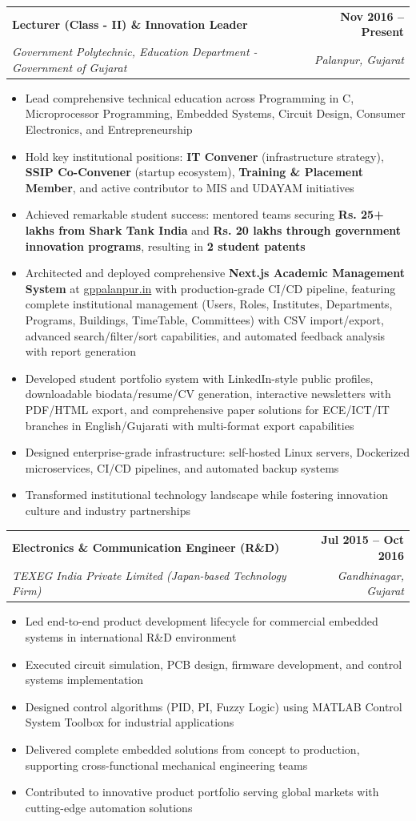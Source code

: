 \documentclass[11pt,a4paper]{article}
\makeatletter
\newcommand{\resumeItem}[1]{
    \item\small{#1 \vspace{-1pt}}
}
\newcommand{\resumeSubheading}[4]{
    \vspace{-1pt}\item
    \begin{tabular*}{0.97\textwidth}[t]{l@{\extracolsep{\fill}}r}
        \textbf{\color{secondary}#1} & \textbf{\color{mediumgray}\small #2} \\
        \textit{\small\color{primary}#3} & \textit{\small\color{mediumgray} #4} \\
    \end{tabular*}\vspace{-3pt}
}
\newcommand{\resumeItemListStart}{\begin{itemize}[leftmargin=0.3in]}
\newcommand{\resumeItemListEnd}{\end{itemize}\vspace{-4pt}}
\makeatother
\begin{document}
\resumeSubheading
{Lecturer (Class - II) \& Innovation Leader}{Nov 2016 -- Present}
{Government Polytechnic, Education Department - Government of Gujarat}{Palanpur, Gujarat}
\resumeItemListStart
\resumeItem{Lead comprehensive technical education across Programming in C, Microprocessor Programming, Embedded Systems, Circuit Design, Consumer Electronics, and Entrepreneurship}
\resumeItem{Hold key institutional positions: \textbf{IT Convener} (infrastructure strategy), \textbf{SSIP Co-Convener} (startup ecosystem), \textbf{Training \& Placement Member}, and active contributor to MIS and UDAYAM initiatives}
\resumeItem{Achieved remarkable student success: mentored teams securing \textbf{Rs. 25+ lakhs from Shark Tank India} and \textbf{Rs. 20 lakhs through government innovation programs}, resulting in \textbf{2 student patents}}
\resumeItem{Architected and deployed comprehensive \textbf{Next.js Academic Management System} at \href{https://gppalanpur.in/}{gppalanpur.in} with production-grade CI/CD pipeline, featuring complete institutional management (Users, Roles, Institutes, Departments, Programs, Buildings, TimeTable, Committees) with CSV import/export, advanced search/filter/sort capabilities, and automated feedback analysis with report generation}
\resumeItem{Developed student portfolio system with LinkedIn-style public profiles, downloadable biodata/resume/CV generation, interactive newsletters with PDF/HTML export, and comprehensive paper solutions for ECE/ICT/IT branches in English/Gujarati with multi-format export capabilities}
\resumeItem{Designed enterprise-grade infrastructure: self-hosted Linux servers, Dockerized microservices, CI/CD pipelines, and automated backup systems}
\resumeItem{Transformed institutional technology landscape while fostering innovation culture and industry partnerships}
\resumeItemListEnd

\resumeSubheading
{Electronics \& Communication Engineer (R\&D)}{Jul 2015 -- Oct 2016}
{TEXEG India Private Limited (Japan-based Technology Firm)}{Gandhinagar, Gujarat}
\resumeItemListStart
\resumeItem{Led end-to-end product development lifecycle for commercial embedded systems in international R\&D environment}
\resumeItem{Executed circuit simulation, PCB design, firmware development, and control systems implementation}
\resumeItem{Designed control algorithms (PID, PI, Fuzzy Logic) using MATLAB Control System Toolbox for industrial applications}
\resumeItem{Delivered complete embedded solutions from concept to production, supporting cross-functional mechanical engineering teams}
\resumeItem{Contributed to innovative product portfolio serving global markets with cutting-edge automation solutions}
\resumeItemListEnd
\end{document}
